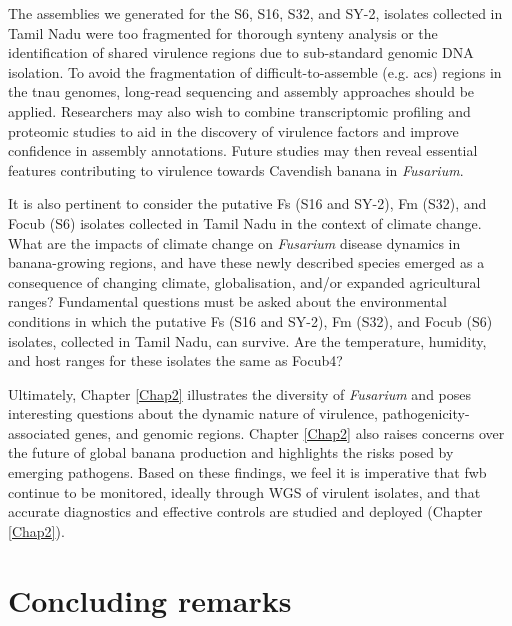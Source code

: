 The assemblies we generated for the S6, S16, S32, and SY-2,  isolates collected in Tamil Nadu were too fragmented for thorough synteny analysis or the identification of shared virulence regions due to sub-standard genomic DNA isolation. To avoid the fragmentation of difficult-to-assemble (e.g. \acp{ac}) regions in the \ac{tnau} genomes, long-read sequencing and assembly approaches should be applied. Researchers may also wish to combine transcriptomic profiling and proteomic studies to aid in the discovery of virulence factors and improve confidence in assembly annotations. Future studies may then reveal essential features contributing to virulence towards Cavendish banana in \textit{Fusarium}. 

It is also pertinent to consider the putative \ac{Fs} (S16 and SY-2), \ac{Fm} (S32), and \ac{Focub} (S6) isolates collected in Tamil Nadu in the context of climate change. What are the impacts of climate change on \textit{Fusarium} disease dynamics in banana-growing regions, and have these newly described species emerged as a consequence of changing climate, globalisation, and/or expanded agricultural ranges? Fundamental questions must be asked about the environmental conditions in which the putative \ac{Fs} (S16 and SY-2), \ac{Fm} (S32), and \ac{Focub} (S6) isolates, collected in Tamil Nadu, can survive. Are the temperature, humidity, and host ranges for these isolates the same as \ac{Focub4}? 

Ultimately, Chapter \ref{Chap2} illustrates the diversity of \textit{Fusarium} and poses interesting questions about the dynamic nature of virulence, pathogenicity-associated genes, and genomic regions. Chapter \ref{Chap2} also raises concerns over the future of global banana production and highlights the risks posed by emerging pathogens. Based on these findings, we feel it is imperative that \ac{fwb} continue to be monitored, ideally through WGS of virulent isolates, and that accurate diagnostics and effective controls are studied and deployed (Chapter \ref{Chap2}).

\section{Concluding remarks} 

